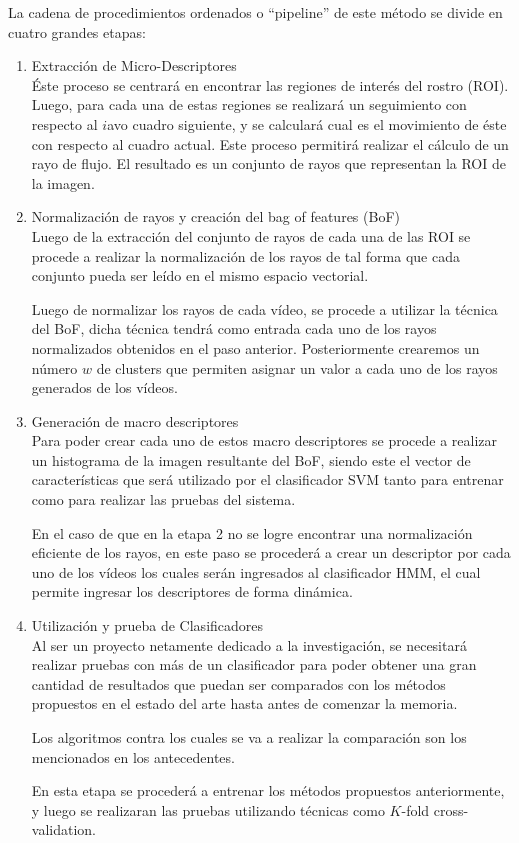 \documentclass{article}
\begin{document}
La cadena de procedimientos ordenados o “pipeline” de este método se divide en cuatro grandes etapas:
    \begin{enumerate}
    \item Extracción de Micro-Descriptores\\
    Éste proceso se centrará en encontrar las regiones de interés del rostro (ROI). Luego, para cada una de estas regiones se realizará un seguimiento con respecto al $i$avo cuadro siguiente, y se calculará cual es el movimiento de éste con respecto al cuadro actual. Este proceso permitirá realizar el cálculo de un rayo de flujo. El resultado es un conjunto de rayos que representan la ROI de la imagen.
    \item Normalización de rayos y creación del bag of features (BoF)\\
Luego de la extracción del conjunto de rayos de cada una de las ROI se procede a realizar la normalización de los rayos de tal forma que cada conjunto pueda ser leído en el mismo espacio vectorial.

Luego de normalizar los rayos de cada vídeo, se procede a utilizar la técnica del BoF, dicha técnica tendrá como entrada cada uno de los rayos normalizados obtenidos en el paso anterior. Posteriormente crearemos un número $w$ de clusters que permiten asignar un valor a cada uno de los rayos generados de los vídeos. 

    \item Generación de macro descriptores\\
Para poder crear cada uno de estos macro descriptores se procede a realizar un histograma de la imagen resultante del BoF, siendo este el vector de características que será utilizado por el clasificador SVM tanto para entrenar como para realizar las pruebas del sistema.

En el caso de que en la etapa 2 no se logre encontrar una normalización eficiente de los rayos, en este paso se procederá a crear un descriptor por cada uno de los vídeos los cuales serán ingresados al clasificador HMM, el cual permite ingresar los descriptores de forma dinámica.
	
    \item Utilización y prueba de Clasificadores\\
Al ser un proyecto netamente dedicado a la investigación, se necesitará realizar pruebas con más de un clasificador para poder obtener una gran cantidad de resultados que puedan ser comparados con los métodos propuestos en el estado del arte hasta antes de comenzar la memoria. 

Los algoritmos contra los cuales se va a realizar la comparación son los mencionados en los antecedentes.

En esta etapa se procederá a entrenar los métodos propuestos anteriormente, y luego se realizaran las pruebas utilizando técnicas como $K$-fold cross-validation.
    \end{enumerate}
    
\end{document}
